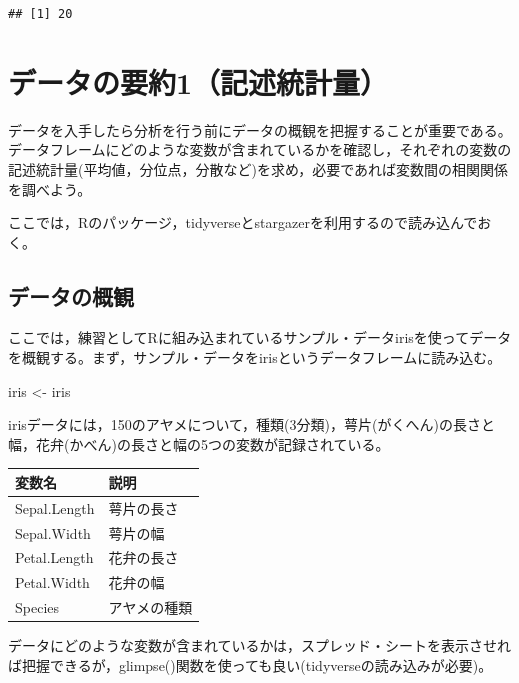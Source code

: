 \documentclass[
]{book}
\newenvironment{Shaded}{\begin{snugshade}}{\end{snugshade}}
\newcommand{\NormalTok}[1]{#1}
\newcommand{\OtherTok}[1]{\textcolor[rgb]{0.56,0.35,0.01}{#1}}
\begin{document}
\begin{verbatim}
## [1] 20
\end{verbatim}

\hypertarget{ux30c7ux30fcux30bfux306eux8981ux7d041ux8a18ux8ff0ux7d71ux8a08ux91cf}{%
\chapter{データの要約1（記述統計量）}\label{ux30c7ux30fcux30bfux306eux8981ux7d041ux8a18ux8ff0ux7d71ux8a08ux91cf}}

データを入手したら分析を行う前にデータの概観を把握することが重要である。データフレームにどのような変数が含まれているかを確認し，それぞれの変数の記述統計量(平均値，分位点，分散など)を求め，必要であれば変数間の相関関係を調べよう。

ここでは，Rのパッケージ，tidyverseとstargazerを利用するので読み込んでおく。

\hypertarget{ux30c7ux30fcux30bfux306eux6982ux89b3}{%
\section{データの概観}\label{ux30c7ux30fcux30bfux306eux6982ux89b3}}

ここでは，練習としてRに組み込まれているサンプル・データirisを使ってデータを概観する。まず，サンプル・データをirisというデータフレームに読み込む。

\begin{Shaded}
\begin{Highlighting}[]
\NormalTok{iris }\OtherTok{\textless{}{-}}\NormalTok{ iris}
\end{Highlighting}
\end{Shaded}

irisデータには，150のアヤメについて，種類(3分類)，萼片(がくへん)の長さと幅，花弁(かべん)の長さと幅の5つの変数が記録されている。

\begin{longtable}[]{@{}ll@{}}
\toprule
変数名 & 説明 \\
\midrule
\endhead
Sepal.Length & 萼片の長さ \\
Sepal.Width & 萼片の幅 \\
Petal.Length & 花弁の長さ \\
Petal.Width & 花弁の幅 \\
Species & アヤメの種類 \\
\bottomrule
\end{longtable}

データにどのような変数が含まれているかは，スプレッド・シートを表示させれば把握できるが，glimpse()関数を使っても良い(tidyverseの読み込みが必要)。
\end{document}
